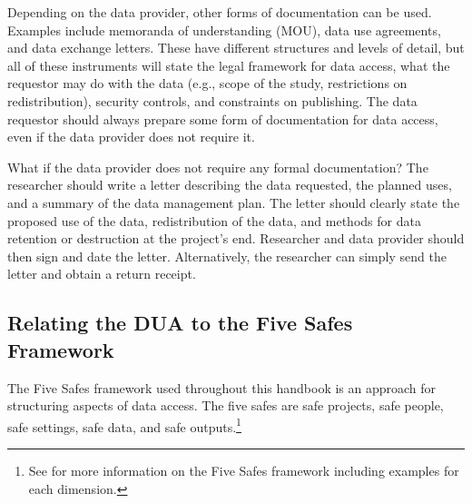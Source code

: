 Depending on the data provider, other forms of documentation can be used. Examples include memoranda of understanding (MOU), data use agreements, and data exchange letters. These have different structures and levels of detail, but all of these instruments will state the legal framework for data access, what the requestor may do with the data (e.g., scope of the study, restrictions on redistribution), security controls, and constraints on publishing. The data requestor should always prepare some form of documentation for data access, even if the data provider does not require it.


\begin{bbox}

What if the data provider does not require any formal documentation? The researcher should write a letter describing the data requested, the planned uses, and a summary of the data management plan. The letter should clearly state the proposed use of the data, redistribution of the data, and methods for data retention or destruction at the project's end. Researcher and data provider should then sign and date the letter. Alternatively, the researcher can simply send the letter and obtain a return receipt.

\end{bbox}


\hypertarget{relating-the-dua-to-the-five-safes-framework}{%
\subsection{Relating the DUA to the Five Safes Framework}\label{relating-the-dua-to-the-five-safes-framework}}

The Five Safes framework used throughout this handbook is an approach for structuring aspects of data access. The five safes are safe projects, safe people, safe settings, safe data, and safe outputs.\footnote{See \citet{desai2016} for more information on the Five Safes framework including examples for each dimension.}


